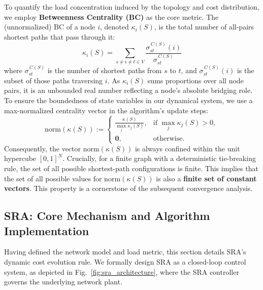 \documentclass[journal]{IEEEtran}
\begin{document}
To quantify the load concentration induced by the topology and cost distribution, we employ \textbf{Betweenness Centrality (BC)} as the core metric. The (unnormalized) BC of a node $i$, denoted $\kappa_i(S)$, is the total number of all-pairs shortest paths that pass through it:
\begin{equation}
    \label{eq:bc_definition}
    \kappa_i(S) = \sum_{s\neq i\neq t\in V} \frac{\sigma^{\,C(S)}_{st}(i)}{\sigma^{\,C(S)}_{st}}
\end{equation}
where $\sigma^{\,C(S)}_{st}$ is the number of shortest paths from $s$ to $t$, and $\sigma^{\,C(S)}_{st}(i)$ is the subset of those paths traversing $i$. As $\kappa_i(S)$ sums proportions over all node pairs, it is an unbounded real number reflecting a node's absolute bridging role. To ensure the boundedness of state variables in our dynamical system, we use a max-normalized centrality vector in the algorithm's update steps:
\begin{equation}
    \label{eq:bc_normalization}
    \mathrm{norm}(\kappa(S)) :=
    \begin{cases}
    \displaystyle \frac{\kappa(S)}{\max_{j}\kappa_j(S)}, & \text{if } \max_j \kappa_j(S) > 0,\\[6pt]
    \mathbf{0}, & \text{otherwise.}
    \end{cases}
\end{equation}
Consequently, the vector $\mathrm{norm}(\kappa(S))$ is always confined within the unit hypercube $[0,1]^N$. Crucially, for a finite graph with a deterministic tie-breaking rule, the set of all possible shortest-path configurations is finite. This implies that the set of all possible values for $\mathrm{norm}(\kappa(S))$ is also a \textbf{finite set of constant vectors}. This property is a cornerstone of the subsequent convergence analysis.

\subsection{SRA: Core Mechanism and Algorithm Implementation}
\label{subsec:sra_mechanism}

Having defined the network model and load metric, this section details SRA's dynamic cost evolution rule. We formally design SRA as a closed-loop control system, as depicted in Fig.~\ref{fig:sra_architecture}, where the SRA controller governs the underlying network plant.
\end{document}
